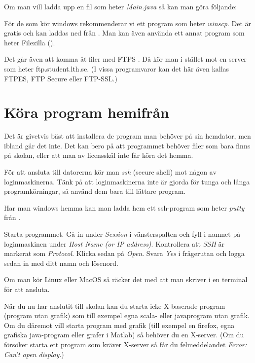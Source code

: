\documentclass[a4paper,twocolumn]{book}
\begin{document}
Om man vill ladda upp en fil som heter \emph{Main.java} så kan man göra följande:



För de som kör windows rekommenderar vi ett program som heter \emph{winscp}.
Det är gratis och kan laddas ned från . Man kan även
använda ett annat program som heter Filezilla
().

Det går även att komma åt filer med FTPS . Då kör man i stället mot en server
som heter ftp.student.lth.se. (I vissa programvaror kan det här även kallas
FTPES, FTP Secure eller FTP-SSL.)


\section{Köra program hemifrån}

Det är givetvis bäst att installera de program man behöver på sin hemdator,
men ibland går det inte. Det kan bero på att programmet behöver filer som bara
finns på skolan, eller att man av licensskäl inte får köra det hemma.

För att ansluta till datorerna kör man \emph{ssh} (secure shell) mot någon av
loginmaskinerna. Tänk på att loginmaskinerna inte är gjorda för tunga
och långa programkörningar, så använd dem bara till lättare program.

Har man windows hemma kan man ladda hem ett ssh-program som heter
\emph{putty} från .

Starta
programmet. Gå in under \emph{Session} i vänsterspalten och fyll i
namnet på loginmaskinen
under \emph{Host Name (or IP address)}.
Kontrollera att \emph{SSH} är markerat som
\emph{Protocol}. Klicka
sedan på \emph{Open}. Svara \emph{Yes} i frågerutan och logga sedan in med
ditt namn och lösenord.

Om man kör Linux eller MacOS så räcker det med att man skriver
 i en terminal för att ansluta.

När du nu har anslutit till skolan kan du starta icke X-baserade program
(program utan grafik) som till exempel egna scala- eller javaprogram
utan grafik.
Om du däremot vill starta program med grafik (till exempel en firefox, egna
grafiska java-program eller grafer i Matlab) så behöver du en X-server.
(Om du försöker starta ett program som kräver X-server så får du
felmeddelandet \emph{Error: Can't open display}.)
\end{document}
